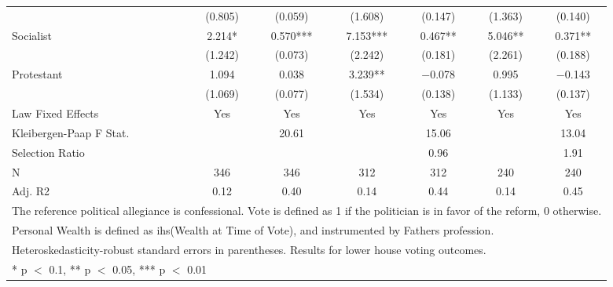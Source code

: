 \begin{table}
\begin{tabular}[t]{lcccccc}
 & (\num{0.805}) & (\num{0.059}) & (\num{1.608}) & (\num{0.147}) & (\num{1.363}) & (\num{0.140})\\
Socialist & \num{2.214}* & \num{0.570}*** & \num{7.153}*** & \num{0.467}** & \num{5.046}** & \num{0.371}**\\
 & (\num{1.242}) & (\num{0.073}) & (\num{2.242}) & (\num{0.181}) & (\num{2.261}) & (\num{0.188})\\
Protestant & \num{1.094} & \num{0.038} & \num{3.239}** & \num{-0.078} & \num{0.995} & \num{-0.143}\\
 & (\num{1.069}) & (\num{0.077}) & (\num{1.534}) & (\num{0.138}) & (\num{1.133}) & (\num{0.137})\\
\midrule
Law Fixed Effects & Yes & Yes & Yes & Yes & Yes & Yes\\
Kleibergen-Paap F Stat. &  & 20.61 &  & 15.06 &  & 13.04\\
Selection Ratio &  &  &  & 0.96 &  & 1.91\\
N & \num{346} & \num{346} & \num{312} & \num{312} & \num{240} & \num{240}\\
Adj. R2 & \num{0.12} & \num{0.40} & \num{0.14} & \num{0.44} & \num{0.14} & \num{0.45}\\
\bottomrule
\multicolumn{7}{l}{\rule{0pt}{1em}The reference political allegiance is confessional. Vote is defined as 1 if the politician is in favor of the reform, 0 otherwise.}\\
\multicolumn{7}{l}{\rule{0pt}{1em}Personal Wealth is defined as ihs(Wealth at Time of Vote), and instrumented by Fathers profession.}\\
\multicolumn{7}{l}{\rule{0pt}{1em}Heteroskedasticity-robust standard errors in parentheses. Results for lower house voting outcomes.}\\
\multicolumn{7}{l}{\rule{0pt}{1em}* p $<$ 0.1, ** p $<$ 0.05, *** p $<$ 0.01}\\
\end{tabular}
\end{table}
